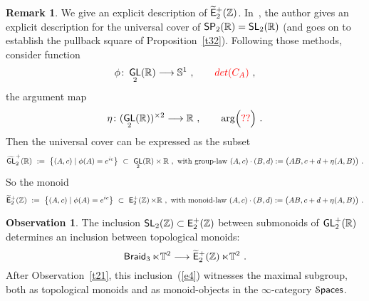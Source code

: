 \documentclass{amsart}
\theoremstyle{definition}
\newtheorem{observation}[theorem]{Observation}
\newtheorem{remark}[theorem]{Remark}
\theoremstyle{remark}
\DeclareMathOperator{\Spaces}{\cS\mathsf{paces}}
\newcommand{\w}{\widetilde}
\def\sE{\mathsf E}\def\sF{\mathsf F}\def\sG{\mathsf G}\def\sH{\mathsf H}
\DeclareMathOperator{\Braid}{{\sf Braid}_3}
\DeclareMathOperator{\Ebraid}{\w{\sf E}_{2}^{+}(\ZZ)}
\DeclareMathOperator{\GL}{\sf GL}
\DeclareMathOperator{\SP}{\sf SP}
\DeclareMathOperator{\SL}{\sf SL}
\DeclareMathOperator{\EpZ}{\sE^+_2(\ZZ)}
\begin{document}
\begin{remark}
We give an explicit description of $\Ebraid$.
In~\cite{rawn}, the author gives an explicit description for the universal cover of $\SP_{2}(\RR) = \SL_{2}(\RR)$ (and goes on to establish the pullback square of Proposition~\ref{t32}).
Following those methods, consider function
\[
\phi
\colon
\GL_2(\RR)
\longrightarrow
\SS^1
~,\qquad
{\color{red}
det(C_{A})
}
~,
\]
the argument map
\[
\eta 
\colon
(\GL_{2}(\RR))^{\times 2} 
\longrightarrow 
\RR
~,\qquad
\arg\Bigl(
{\color{red}
??
}
\Bigr)
~.
\]
Then the universal cover can be expressed as the subset
\[
\w{\GL}^+_{2}(\RR)
~:=~
\bigl\{
(A, c)  \mid  \phi(A) = e^{ic}
\bigr\}
~\subset~
\GL_2(\RR)\times \RR
~,~
\text{with group-law }(A, c) \cdot (B, d) := \bigl(AB, c + d + \eta(A, B) \bigr)
~.
\]
So the monoid
\[
\Ebraid
~:=~
\bigl\{
(A, c)  \mid  \phi(A) = e^{ic}
\bigr\}
~\subset~
\EpZ \times \RR
~,~
\text{with monoid-law }(A, c) \cdot (B, d) := \bigl(AB, c + d + \eta(A, B) \bigr)
~.
\]
\end{remark}


\begin{observation}
\label{t39}
The inclusion $\SL_2(\ZZ)\subset \EpZ$ between submonoids of $\GL_2^+(\RR)$ determines an inclusion between topological monoids:
\begin{equation}
\label{e4}
\Braid \ltimes \TT^2
\longrightarrow
\Ebraid \ltimes \TT^2 
~.
\end{equation}
After Observation~\ref{t21}, this inclusion~(\ref{e4}) witnesses the maximal subgroup, both as topological monoids and as monoid-objects in the $\infty$-category $\Spaces$.

\end{observation}
\end{document}
